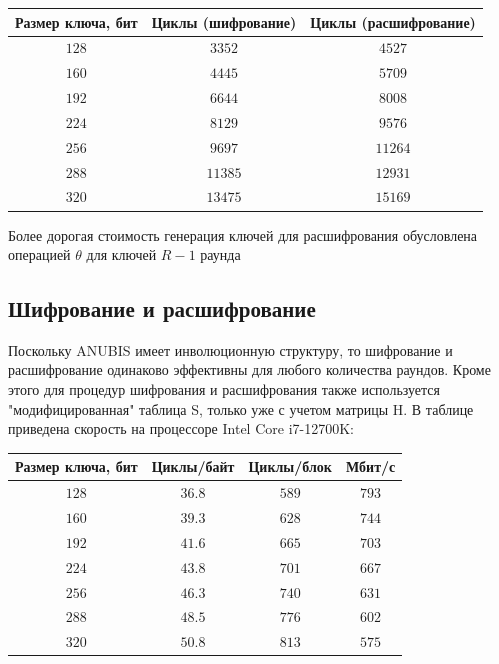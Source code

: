 \documentclass[12pt]{article}
\begin{document}
\begin{center}
\begin{tabular}{|c|c|c|}
    \hline
    Размер ключа, бит & Циклы (шифрование) & Циклы (расшифрование) \\
    \hline
    $128$ & $3352$ & $4527$ \\
    \hline
    $160$ & $4445$ & $5709$ \\
    \hline
    $192$ & $6644$ & $8008$ \\
    \hline
    $224$ & $8129$ & $9576$ \\
    \hline
    $256$ & $9697$ & $11264$ \\
    \hline
    $288$ & $11385$ & $12931$ \\
    \hline
    $320$ & $13475$ & $15169$ \\
    \hline
\end{tabular}
\end{center}

Более дорогая стоимость генерация ключей для расшифрования обусловлена операцией $\theta$ для ключей $R-1$ раунда

\subsection{Шифрование и расшифрование}
Поскольку ANUBIS имеет инволюционную структуру, то шифрование и расшифрование одинаково эффективны для любого количества раундов. Кроме этого для процедур шифрования и расшифрования также используется "модифицированная" таблица S, только уже с учетом матрицы H.  В таблице приведена скорость на процессоре Intel Core i7-12700K:

\begin{center}
\begin{tabular}{|c|c|c|c|}
    \hline
    Размер ключа, бит & Циклы/байт & Циклы/блок & Мбит/с \\
    \hline
    $128$ & $36.8$ & $589$ & $793$ \\
    \hline
    $160$ & $39.3$ & $628$ & $744$ \\
    \hline
    $192$ & $41.6$ & $665$ & $703$ \\
    \hline
    $224$ & $43.8$ & $701$ & $667$ \\
    \hline
    $256$ & $46.3$ & $740$ & $631$ \\
    \hline
    $288$ & $48.5$ & $776$ & $602$ \\
    \hline
    $320$ & $50.8$ & $813$ & $575$ \\
    \hline
\end{tabular}
\end{center}
\end{document}

